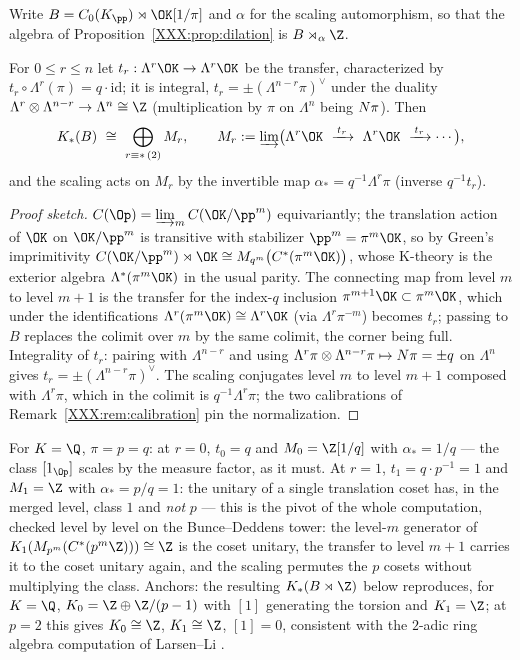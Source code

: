 Write $B=C_0(K_\pp)\rtimes\OK[1/\pi]$ and $\alpha$ for the scaling automorphism, so that
the algebra of Proposition~\ref{XXX:prop:dilation} is $B\rtimes_\alpha\Z$.

\begin{lemma}\label{XXX:lem:tower}
For $0\le r\le n$ let $t_r:\Lambda^r\OK\to\Lambda^r\OK$ be the transfer, characterized by
$t_r\circ\Lambda^r(\pi)=q\cdot\mathrm{id}$; it is integral,
$t_r=\pm(\Lambda^{n-r}\pi)^\vee$ under the duality $\Lambda^r\otimes\Lambda^{n-r}\to
\Lambda^n\cong\Z$ (multiplication by $\pi$ on $\Lambda^n$ being $N\pi$). Then
\[
K_*(B)\ \cong\ \bigoplus_{r\equiv *\,(2)}M_r,\qquad
M_r:=\varinjlim\bigl(\Lambda^r\OK\ \xrightarrow{\,t_r\,}\ \Lambda^r\OK\
\xrightarrow{\,t_r\,}\cdots\bigr),
\]
and the scaling acts on $M_r$ by the invertible map $\alpha_*=q^{-1}\Lambda^r\pi$
(inverse $q^{-1}t_r$).
\end{lemma}

\begin{proof}[Proof sketch]
$C(\Op)=\varinjlim_mC(\OK/\pp^m)$ equivariantly; the translation action of $\OK$ on
$\OK/\pp^m$ is transitive with stabilizer $\pp^m=\pi^m\OK$, so by Green's imprimitivity
$C(\OK/\pp^m)\rtimes\OK\cong M_{q^m}\bigl(C^*(\pi^m\OK)\bigr)$, whose K-theory is the
exterior algebra $\Lambda^*(\pi^m\OK)$ in the usual parity. The connecting map from level
$m$ to level $m{+}1$ is the transfer for the index-$q$ inclusion
$\pi^{m+1}\OK\subset\pi^m\OK$, which under the identifications
$\Lambda^r(\pi^m\OK)\cong\Lambda^r\OK$ (via $\Lambda^r\pi^{-m}$) becomes $t_r$; passing to
$B$ replaces the colimit over $m$ by the same colimit, the corner being full.
Integrality of $t_r$: pairing with $\Lambda^{n-r}$ and using
$\Lambda^r\pi\otimes\Lambda^{n-r}\pi\mapsto N\pi=\pm q$ on $\Lambda^n$ gives
$t_r=\pm(\Lambda^{n-r}\pi)^\vee$. The scaling conjugates level $m$ to level $m{+}1$
composed with $\Lambda^r\pi$, which in the colimit is $q^{-1}\Lambda^r\pi$; the two
calibrations of Remark~\ref{XXX:rem:calibration} pin the normalization.
\end{proof}

\begin{remark}[Two calibrations, $n=1$]\label{XXX:rem:calibration}
For $K=\Q$, $\pi=p=q$: at $r=0$, $t_0=q$ and $M_0=\Z[1/q]$ with $\alpha_*=1/q$ ---
the class $[1_{\Op}]$ scales by the measure factor, as it must. At $r=1$, $t_1=q\cdot
p^{-1}=1$ and $M_1=\Z$ with $\alpha_*=p/q=1$: the unitary of a single translation coset
has, in the merged level, class $1$ and \emph{not} $p$ --- this is the pivot of the whole
computation, checked level by level on the Bunce--Deddens tower: the level-$m$ generator
of $K_1(M_{p^m}(C^*(p^m\Z)))\cong\Z$ is the coset unitary, the transfer to level $m{+}1$
carries it to the coset unitary again, and the scaling permutes the $p$ cosets without
multiplying the class. Anchors: the resulting $K_*(B\rtimes\Z)$ below reproduces, for
$K=\Q$, $K_0=\Z\oplus\Z/(p-1)$ with $[1]$ generating the torsion and $K_1=\Z$; at $p=2$
this gives $K_0\cong\Z$, $K_1\cong\Z$, $[1]=0$, consistent with the $2$-adic ring algebra
computation of Larsen--Li \cite{LarsenLi}.
\end{remark}

